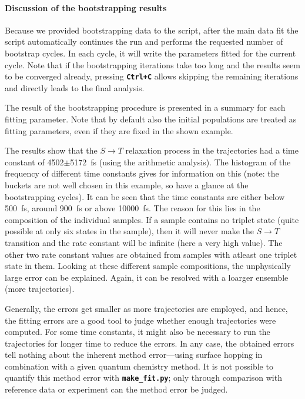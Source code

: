 \documentclass[a4paper,11pt,DIV=15,openany]{scrbook}
\newcommand{\ttt}[1]{\textbf{\texttt{#1}}}
\begin{document}
\paragraph{Discussion of the bootstrapping results}

Because we provided bootstrapping data to the script, after the main data fit the script automatically continues the run and performs the requested number of bootstrap cycles.
In each cycle, it will write the parameters fitted for the current cycle.
Note that if the bootstrapping iterations take too long and the results seem to be converged already, pressing \ttt{Ctrl+C} allows skipping the remaining iterations and directly leads to the final analysis.

The result of the bootstrapping procedure is presented in a summary for each fitting parameter.
Note that by default also the initial populations are treated as fitting parameters, even if they are fixed in the shown example.

The results show that the $S\rightarrow T$ relaxation process in the trajectories had a time constant of 4502$\pm$5172~fs (using the arithmetic analysis). 
The histogram of the frequency of different time constants gives for information on this (note: the buckets are not well chosen in this example, so have a glance at the bootstrapping cycles). It can be seen that the time constants are either below 500~fs, around 900~fs or above 10000~fs. The reason for this lies in the composition of the individual samples. If a sample contains no triplet state (quite possible at only six states in the sample), then it will never make the $S\rightarrow T$ transition and the rate constant will be infinite (here a very high value). The other two rate constant values are obtained from samples with atleast one triplet state in them. Looking at these different sample compositions, the unphysically large error can be explained. Again, it can be resolved with a loarger ensemble (more trajectories).

Generally, the errors get smaller as more trajectories are employed, and hence, the fitting errors are a good tool to judge whether enough trajectories were computed.
For some time constants, it might also be necessary to run the trajectories for longer time to reduce the errors.
In any case, the obtained errors tell nothing about the inherent method error---using surface hopping in combination with a given quantum chemistry method.
It is not possible to quantify this method error with \ttt{make\_fit.py}; only through comparison with reference data or experiment can the method error be judged.
\end{document}

